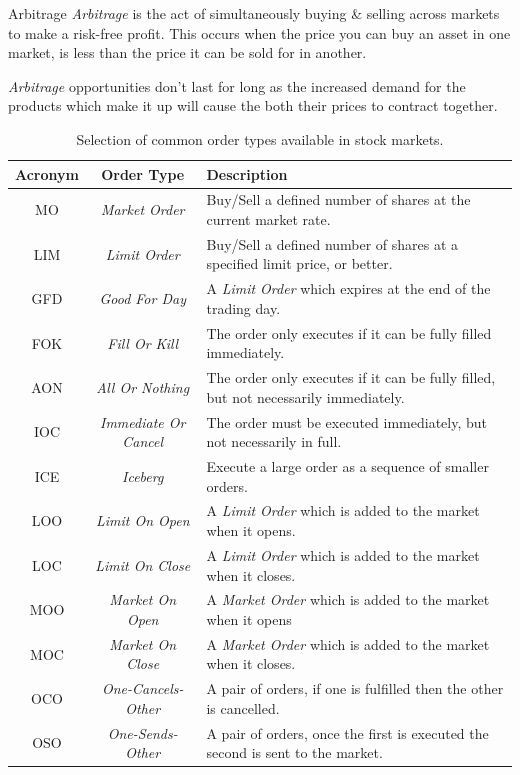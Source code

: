 \documentclass[11pt,a4paper]{article}
\begin{document}
  \begin{definition}{Arbitrage}
    \textit{Arbitrage} is the act of simultaneously buying \& selling across markets to make a risk-free profit. This occurs when the price you can buy an asset in one market, is less than the price it can be sold for in another.
    \par \textit{Arbitrage} opportunities don't last for long as the increased demand for the products which make it up will cause the both their prices to contract together.
  \end{definition}

  \begin{table}
    \begin{tabular}{|c|c|p{}|}
      \hline
      \textbf{Acronym}&\textbf{Order Type}&\textbf{Description}\\
      \hline
      MO&\textit{Market Order}&Buy/Sell a defined number of shares at the current market rate.\\\hline
      LIM&\textit{Limit Order}&Buy/Sell a defined number of shares at a specified limit price, or better.\\\hline
      GFD&\textit{Good For Day}&A \textit{Limit Order} which expires at the end of the trading day.\\\hline
      FOK&\textit{Fill Or Kill}&The order only executes if it can be fully filled immediately.\\\hline
      AON&\textit{All Or Nothing}&The order only executes if it can be fully filled, but not necessarily immediately.\\\hline
      IOC&\textit{Immediate Or Cancel}&The order must be executed immediately, but not necessarily in full.\\\hline
      ICE&\textit{Iceberg}&Execute a large order as a sequence of smaller orders.\\\hline
      LOO&\textit{Limit On Open}&A \textit{Limit Order} which is added to the market when it opens.\\\hline
      LOC&\textit{Limit On Close}&A \textit{Limit Order} which is added to the market when it closes.\\\hline
      MOO&\textit{Market On Open}&A \textit{Market Order} which is added to the market when it opens\\\hline
      MOC&\textit{Market On Close}&A \textit{Market Order} which is added to the market when it closes.\\\hline
      OCO&\textit{One-Cancels-Other}&A pair of orders, if one is fulfilled then the other is cancelled.\\\hline
      OSO&\textit{One-Sends-Other}&A pair of orders, once the first is executed the second is sent to the market.\\\hline
    \end{tabular}
    \caption{Selection of common order types available in stock markets.}
    \label{tab_OrderTypes}
  \end{table}
\end{document}
